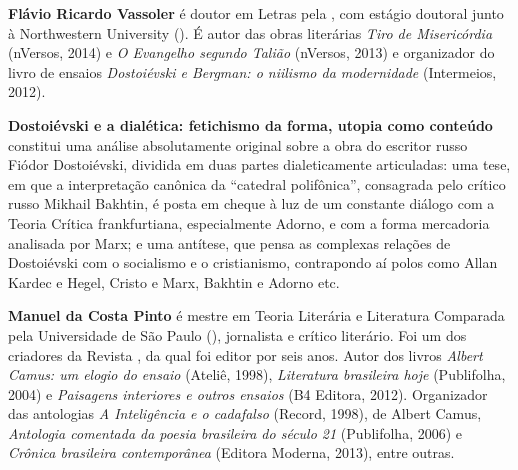 
\textbf{Flávio Ricardo Vassoler} é doutor em Letras pela , com estágio doutoral junto à
  Northwestern University (). É autor das obras literárias \emph{Tiro
  de Misericórdia} (nVersos, 2014) e \emph{O Evangelho segundo Talião}
  (nVersos, 2013) e organizador do livro de ensaios \emph{Dostoiévski e
  Bergman: o niilismo da modernidade} (Intermeios, 2012).

\textbf{Dostoiévski e a dialética: fetichismo da forma, utopia como conteúdo} constitui uma análise absolutamente original sobre a obra do escritor russo Fiódor Dostoiévski, dividida em duas partes dialeticamente articuladas: uma tese, em que a interpretação canônica da ``catedral polifônica'', consagrada pelo crítico russo Mikhail Bakhtin, é posta em cheque à luz de um constante diálogo com a Teoria Crítica frankfurtiana, especialmente Adorno, e com a forma mercadoria analisada por Marx; e uma antítese, que pensa as complexas relações de Dostoiévski com o socialismo e o cristianismo, contrapondo aí polos como Allan Kardec e Hegel, Cristo e Marx, Bakhtin e Adorno etc.

\textbf{Manuel da Costa Pinto} é mestre em Teoria Literária e Literatura Comparada pela Universidade de São Paulo (), jornalista e crítico literário. Foi um dos criadores da Revista , da qual foi editor por seis anos. Autor dos livros \emph{Albert Camus: um elogio do ensaio} (Ateliê, 1998), \emph{Literatura brasileira hoje} (Publifolha, 2004) e \emph{Paisagens interiores e outros ensaios} (B4 Editora, 2012). Organizador das antologias \emph{A Inteligência e o cadafalso} (Record, 1998), de Albert Camus, \emph{Antologia comentada da poesia brasileira do século 21} (Publifolha, 2006) e \emph{Crônica brasileira contemporânea} (Editora Moderna, 2013), entre outras.







